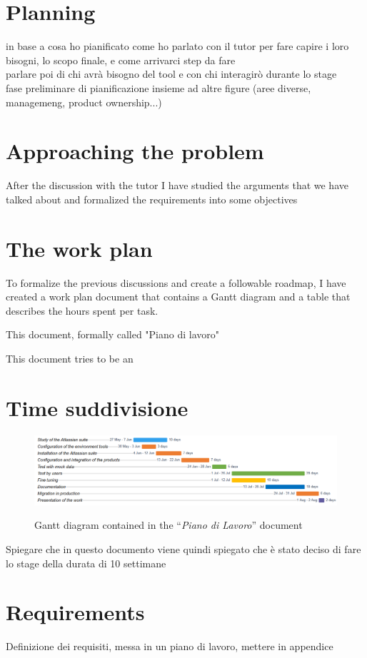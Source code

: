 \section{Planning}
in base a cosa ho pianificato
come ho parlato con il tutor per fare capire i loro bisogni, lo scopo finale, e come arrivarci
step da fare\\
parlare poi di chi avrà bisogno del tool e con chi interagirò durante lo stage\\
fase preliminare di pianificazione insieme ad altre figure (aree diverse, managemeng, product ownership...)

\section{Approaching the problem}

	After the discussion with the tutor I have studied the arguments that we have talked about and formalized the requirements into some objectives

\section{The work plan}

	To formalize the previous discussions and create a followable roadmap, I have created a work plan document that contains a Gantt diagram and a table that describes the hours spent per task.
	
	This document, formally called "Piano di lavoro"
	
	This document tries to be an
	
	\section{Time suddivisione}
	
		\begin{figure}[H]
			\centering
			\includegraphics[width=1.1\textwidth]{resources/work_plan_gantt}\\
			\caption{Gantt diagram contained in the ``\textit{Piano di Lavoro}'' document}
		\end{figure}

		Spiegare che in questo documento viene quindi spiegato che è stato deciso di fare lo stage della durata di 10 settimane

	\section{Requirements}
	
		Definizione dei requisiti, messa in un piano di lavoro, mettere in appendice
	
